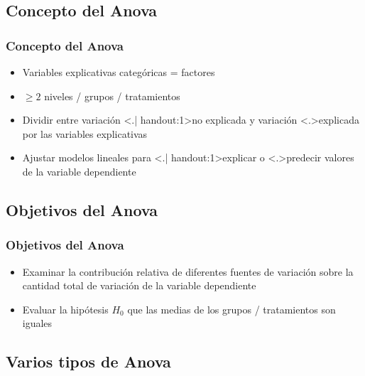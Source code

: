 \documentclass[mathserif]{beamer}
\begin{document}
\subsection[Concepto]{Concepto del Anova}
 
\begin{frame}[label=anov6]
   \frametitle{Concepto del Anova}
    \begin{itemize}[<+-| handout:1>]
      \item Variables explicativas categ\'oricas = \alert{factores}
      \item $\geq 2$ \alert{niveles} / grupos / tratamientos
      \item Dividir entre variaci\'on \structure<.| handout:1>{no explicada} y variaci\'on \structure<.>{explicada} por las variables explicativas
      \item Ajustar modelos lineales para \structure<.| handout:1>{explicar} o \structure<.>{predecir} valores de la variable dependiente
   \end{itemize}
\end{frame}%


\subsection[Objetivos]{Objetivos del Anova}

\begin{frame}[label=anov7]
   \frametitle{Objetivos del Anova}
    \begin{itemize}[<+-| handout:1>]
      \item Examinar la contribuci\'on relativa de diferentes fuentes de variaci\'on sobre la cantidad total de variaci\'on de la variable dependiente
      \item Evaluar la hip\'otesis $H_0$ que las medias de los grupos / tratamientos son iguales
   \end{itemize}
\end{frame}%


\subsection[Varios tipos]{Varios tipos de Anova}
 
\end{document}

